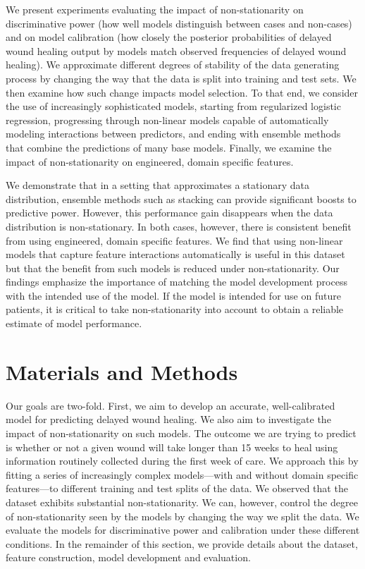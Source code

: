 We present experiments evaluating the impact of non-stationarity on
discriminative power (how well models distinguish between cases and
non-cases) and on model calibration (how closely the posterior
probabilities of delayed wound healing output by models match observed
frequencies of delayed wound healing).  We approximate different
degrees of stability of the data generating process by changing the
way that the data is split into training and test sets. We then
examine how such change impacts model selection.  To that end, we
consider the use of increasingly sophisticated models, starting from
regularized logistic regression, progressing through non-linear models
capable of automatically modeling interactions between predictors, and
ending with ensemble methods that combine the predictions of many base
models.  Finally, we examine the impact of non-stationarity on
engineered, domain specific features.

We demonstrate that in a setting that approximates a stationary data
distribution, ensemble methods such as stacking can provide
significant boosts to predictive power.  However, this performance
gain disappears when the data distribution is non-stationary.  In both
cases, however, there is consistent benefit from using engineered,
domain specific features.  We find that using non-linear models that
capture feature interactions automatically is useful in this dataset
but that the benefit from such models is reduced under
non-stationarity.  Our findings emphasize the importance of matching
the model development process with the intended use of the model. If
the model is intended for use on future patients, it is critical to
take non-stationarity into account to obtain a reliable estimate of
model performance.

\section{Materials and Methods}
Our goals are two-fold.  First, we aim to develop an accurate,
well-calibrated model for predicting delayed wound healing.  We also
aim to investigate the impact of non-stationarity on such models.  The
outcome we are trying to predict is whether or not a given wound will
take longer than 15 weeks to heal using information routinely
collected during the first week of care. We approach this by fitting a
series of increasingly complex models—with and without domain specific
features—to different training and test splits of the data.  We
observed that the dataset exhibits substantial non-stationarity.  We
can, however, control the degree of non-stationarity seen by the
models by changing the way we split the data.  We evaluate the models
for discriminative power and calibration under these different
conditions.  In the remainder of this section, we provide details
about the dataset, feature construction, model development and
evaluation.

